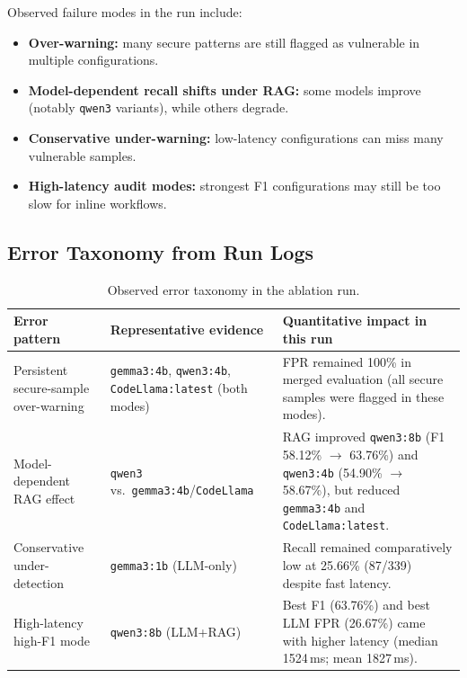 Observed failure modes in the run include:
\begin{itemize}
  \item \textbf{Over-warning:} many secure patterns are still flagged as vulnerable in multiple configurations.
  \item \textbf{Model-dependent recall shifts under RAG:} some models improve (notably \texttt{qwen3} variants), while others degrade.
  \item \textbf{Conservative under-warning:} low-latency configurations can miss many vulnerable samples.
  \item \textbf{High-latency audit modes:} strongest F1 configurations may still be too slow for inline workflows.
\end{itemize}

\subsection*{Error Taxonomy from Run Logs}

\begin{table}[H]
  \centering
  \caption{Observed error taxonomy in the ablation run.}
  \label{tab:eval-error-taxonomy}
  \footnotesize
  \renewcommand{\arraystretch}{1.15}
  \begin{tabular}{p{}p{}p{}}
    \toprule
    Error pattern & Representative evidence & Quantitative impact in this run \\
    \midrule
    Persistent secure-sample over-warning & \texttt{gemma3:4b}, \texttt{qwen3:4b}, \texttt{CodeLlama:latest} (both modes) & FPR remained 100\% in merged evaluation (all secure samples were flagged in these modes). \\
    Model-dependent RAG effect & \texttt{qwen3} vs.\ \texttt{gemma3:4b}/\texttt{CodeLlama} & RAG improved \texttt{qwen3:8b} (F1 58.12\% $\rightarrow$ 63.76\%) and \texttt{qwen3:4b} (54.90\% $\rightarrow$ 58.67\%), but reduced \texttt{gemma3:4b} and \texttt{CodeLlama:latest}. \\
    Conservative under-detection & \texttt{gemma3:1b} (LLM-only) & Recall remained comparatively low at 25.66\% (87/339) despite fast latency. \\
    High-latency high-F1 mode & \texttt{qwen3:8b} (LLM+RAG) & Best F1 (63.76\%) and best LLM FPR (26.67\%) came with higher latency (median 1524\,ms; mean 1827\,ms). \\
    \bottomrule
  \end{tabular}
\end{table}

